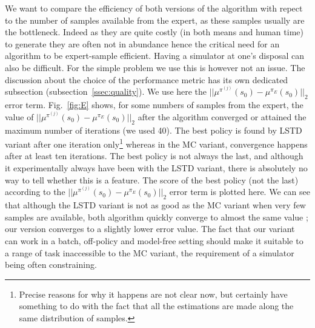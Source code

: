 \documentclass{jfpda2011}
\begin{document}
We want to compare the efficiency of both versions of the algorithm with repect to the number of samples available from the expert, as these samples usually are the bottleneck. Indeed as they are quite costly (in both means and human time) to generate they are often not in abundance hence the critical need for an algorithm to be expert-sample efficient. Having a simulator at one's disposal can also be difficult. For the simple problem we use this is however not an issue. The discussion about the choice of the performance metric has its own dedicated subsection (subsection~\ref{ssec:quality}). We use here the $||\mu^{\pi^{(j)}}(s_0) - \mu^{\pi_E}(s_0)||_2$ error term. Fig.~\ref{fig:E} shows, for some numbers of samples from the expert, the value of $||\mu^{\pi^{(j)}}(s_0)-\mu^{\pi_E}(s_0)||_2$ after the algorithm converged or attained the maximum number of iterations (we used 40). The best policy is found by LSTD variant after one iteration only\footnote{Precise reasons for why it happens are not clear now, but certainly have something to do with the fact that all the estimations are made along the same distribution of samples.} whereas in the MC variant, convergence happens after at least ten iterations. The best policy is not always the last, and although it experimentally always have been with the LSTD variant, there is absolutely no way to tell whether this is a feature. The score of the best policy (not the last) according to the $||\mu^{\pi^{(j)}}(s_0) - \mu^{\pi_E}(s_0)||_2$ error term is plotted here. We can see that although the LSTD variant is not as good as the MC variant when very few samples are available, both algorithm quickly converge to almost the same value ; our version converges to a slightly lower error value. The fact that our variant can work in a batch, off-policy and model-free setting should make it suitable to a range of task inaccessible to the MC variant, the requirement of a simulator being often constraining.
\end{document}
